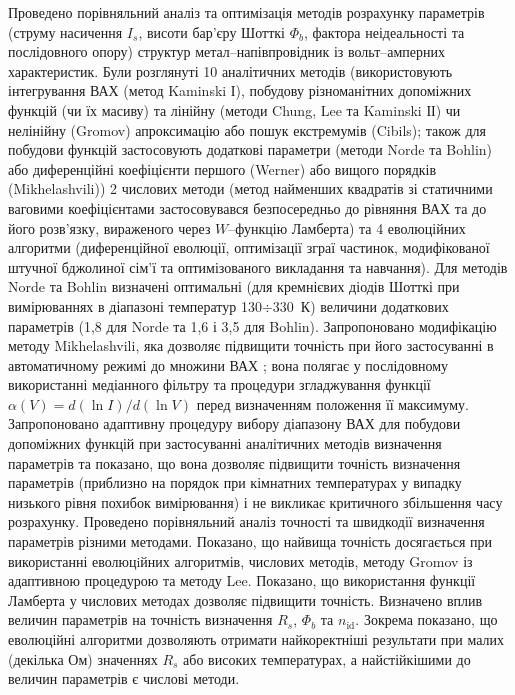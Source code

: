 Проведено порівняльний аналіз та оптимізація методів розрахунку параметрів (струму насичення  $I_s$, висоти бар'єру Шотткі  $\Phi_b$, фактора неідеальності та послідовного опору) структур метал--напівпровідник із вольт--амперних характеристик.
Були розглянуті 10 аналітичних методів (використовують інтегрування ВАХ (метод Kaminski І), побудову різноманітних допоміжних функцій (чи їх масиву) та лінійну (методи Chung, Lee та Kaminski ІІ) чи нелінійну (Gromov) апроксимацію або пошук екстремумів (Cibils);
також для побудови функцій застосовують додаткові параметри (методи Norde та Bohlin) або диференційні коефіцієнти першого (Werner) або вищого порядків (Mikhelashvili))
2 числових методи (метод найменших квадратів зі статичними ваговими коефіцієнтами застосовувався безпосередньо до рівняння ВАХ та до його розв'язку, вираженого через $W$--функцію Ламберта) та
4 еволюційних алгоритми (диференційної еволюції,
оптимізації зграї частинок,
модифікованої штучної бджолиної сім'ї  та
оптимізованого викладання та навчання).
Для методів Norde та Bohlin визначені  оптимальні (для кремнієвих діодів Шотткі при вимірюваннях в діапазоні температур 130$\div$330~К) величини додаткових параметрів (1,8 для Norde та 1,6 і 3,5 для Bohlin).
Запропоновано модифікацію методу Mikhelashvili, яка дозволяє підвищити точність при його застосуванні в автоматичному режимі до множини ВАХ ;
вона полягає у послідовному використанні медіанного фільтру та процедури згладжування функції $\alpha(V)=d(\ln I)/d(\ln V)$ перед визначенням положення її максимуму.
Запропоновано адаптивну процедуру вибору діапазону ВАХ для побудови допоміжних функцій при застосуванні аналітичних методів визначення параметрів та показано, що вона дозволяє підвищити точність визначення параметрів (приблизно на порядок при кімнатних температурах у випадку низького рівня похибок вимірювання) і не викликає критичного збільшення часу розрахунку.
Проведено порівняльний аналіз точності  та швидкодії  визначення параметрів різними методами.
Показано, що найвища точність досягається при використанні еволюцiйних алгоритмів, числових методів, методу Gromov із адаптивною процедурою та методу Lee.
Показано, що використання функції Ламберта у числових методах дозволяє підвищити точність.
Визначено вплив величин параметрів на точність визначення $R_s$, $\Phi_b$ та $n_\mathrm{id}$.
Зокрема показано, що еволюційні алгоритми дозволяють отримати найкоректніші результати при малих (декілька Ом) значеннях $R_s$ або високих температурах, а найстійкішими до величин параметрів є числові методи.

